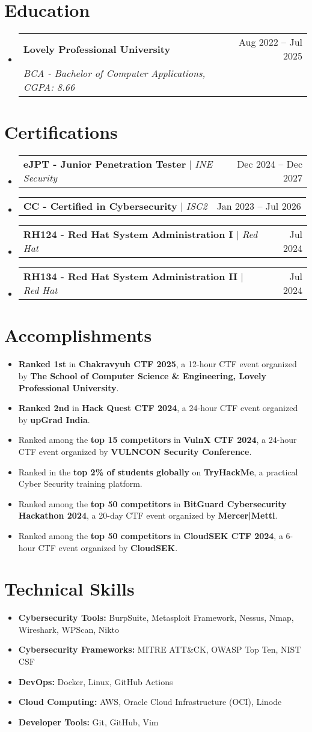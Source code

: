 \documentclass[letterpaper,12pt]{article}
\newcommand{\resumeItem}[1]{
  \item[--]\small{#1} %
}
\newcommand{\resumeSubheading}[4]{
  \item \vspace{1pt}
    \begin{tabularx}{\textwidth}{Xr}
      \textbf{#1} & #2 \\
      \textit{\small#3} & \textit{\small #4} \\
    \end{tabularx} \vspace{1pt}
}
\newcommand{\resumeCertHeading}[2]{
    \item
    \begin{tabularx}{\textwidth}{Xr}
      \small#1 & #2 \\
    \end{tabularx}
}
\newcommand{\resumeItemListStart}{\begin{itemize}[topsep=1pt, itemsep=1pt, leftmargin=0.2in]}
\newcommand{\resumeItemListEnd}{\end{itemize} \vspace{1pt}}
\newcommand{\resumeSubHeadingListStart}{\begin{itemize}[leftmargin=0.15in, label={}, topsep=2pt]}
\newcommand{\resumeSubHeadingListEnd}{\end{itemize}}
\begin{document}

\section{Education}
  \resumeSubHeadingListStart
    \resumeSubheading
      {Lovely Professional University}{Aug 2022 -- Jul 2025}
      {BCA - Bachelor of Computer Applications, CGPA: 8.66}{}
  \resumeSubHeadingListEnd


\section{Certifications}
  \resumeSubHeadingListStart
    \resumeCertHeading
      {\textbf{eJPT - Junior Penetration Tester} $|$ \emph{INE Security}}{Dec 2024 -- Dec 2027}
    \resumeCertHeading
      {\textbf{CC - Certified in Cybersecurity} $|$ \emph{ISC2}}{Jan 2023 -- Jul 2026}
    \resumeCertHeading
      {\textbf{RH124 - Red Hat System Administration I} $|$ \emph{Red Hat}}{Jul 2024}
    \resumeCertHeading
      {\textbf{RH134 - Red Hat System Administration II} $|$ \emph{Red Hat}}{Jul 2024}
  \resumeSubHeadingListEnd


\section{Accomplishments}
\resumeItemListStart
    \resumeItem{\textbf{Ranked 1st} in \textbf{Chakravyuh CTF 2025}, a 12-hour CTF event organized by \textbf{The School of Computer Science \& Engineering, Lovely Professional University}.}
    \resumeItem{\textbf{Ranked 2nd} in \textbf{Hack Quest CTF 2024}, a 24-hour CTF event organized by \textbf{upGrad India}.}
    \resumeItem{Ranked among the \textbf{top 15 competitors} in \textbf{VulnX CTF 2024}, a 24-hour CTF event organized by \textbf{VULNCON Security Conference}.}
    \resumeItem{Ranked in the \textbf{top 2\% of students globally} on \textbf{TryHackMe}, a practical Cyber Security training platform.}
    \resumeItem{Ranked among the \textbf{top 50 competitors} in \textbf{BitGuard Cybersecurity Hackathon 2024}, a 20-day CTF event organized by \textbf{Mercer|Mettl}.}
    \resumeItem{Ranked among the \textbf{top 50 competitors} in \textbf{CloudSEK CTF 2024}, a 6-hour CTF event organized by \textbf{CloudSEK}.}
\resumeItemListEnd


\section{Technical Skills}
  \resumeItemListStart
    \resumeItem{\textbf{Cybersecurity Tools:} BurpSuite, Metasploit Framework, Nessus, Nmap, Wireshark, WPScan, Nikto}
    \resumeItem{\textbf{Cybersecurity Frameworks:} MITRE ATT\&CK, OWASP Top Ten, NIST CSF}
    \resumeItem{\textbf{DevOps:} Docker, Linux, GitHub Actions}
    \resumeItem{\textbf{Cloud Computing:} AWS, Oracle Cloud Infrastructure (OCI), Linode}
    \resumeItem{\textbf{Developer Tools:} Git, GitHub, Vim}
  \resumeItemListEnd
\end{document}
